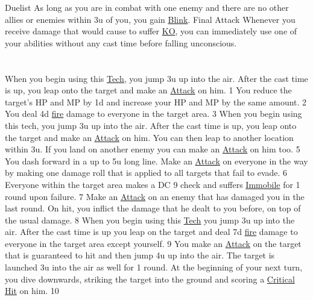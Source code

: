 {Duelist}
{
	As long as you are in combat with one enemy and there are no other allies or enemies within 3u of you, you gain \hyperlink{status}{Blink}.
}
{Final Attack}
{	Whenever you receive damage that would cause to suffer \hyperlink{status}{KO}, you can immediately use one of your abilities without any cast time before falling unconscious.
}
\pagebreak \\
\\\\
{
	When you begin using this \hyperlink{action}{Tech}, you jump 3u up into the air.
	After the cast time is up, you leap onto the target and make an \hyperlink{action}{Attack} on him.
}{}{1}
{
	You reduce the target's HP and MP by 1d and increase your HP and MP by the same amount.
}{}{2}
{
	You deal 4d \hyperlink{type}{fire} damage to everyone in the target area.
}{\fire}{3}
{
	When you begin using this tech, you jump 3u up into the air.
	After the cast time is up, you leap onto the target and make an \hyperlink{action}{Attack} on him.
	You can then leap to another location within 3u.
	If you land on another enemy you can make an \hyperlink{action}{Attack} on him too.
}{}{5}
{
	You dash forward in a up to 5u long line.
	Make an \hyperlink{action}{Attack} on everyone in the way by making one damage roll that is applied to all targets that fail to evade.
}{}{6}
{
	Everyone within the target area makes a DC 9 check and suffers \hyperlink{status}{Immobile} for 1 round upon failure.
}{\immobile}{7}
{
	Make an \hyperlink{action}{Attack} on an enemy that has damaged you in the last round. 
	On hit, you inflict the damage that he dealt to you before, on top of the usual damage.
}{}{8}
{
	When you begin using this \hyperlink{action}{Tech} you jump 3u up into the air.
	After the cast time is up you leap on the target and deal 7d \hyperlink{type}{fire} damage to everyone in the target area except yourself.
}{\fire}{9}
{
	You make an \hyperlink{action}{Attack} on the target that is guaranteed to hit and then jump 4u up into the air. 
	The target is launched 3u into the air as well for 1 round.
	At the beginning of your next turn, you dive downwards, striking the target into the ground and scoring a \hyperlink{action}{Critical Hit} on him.
}{}{10}
\pagebreak
